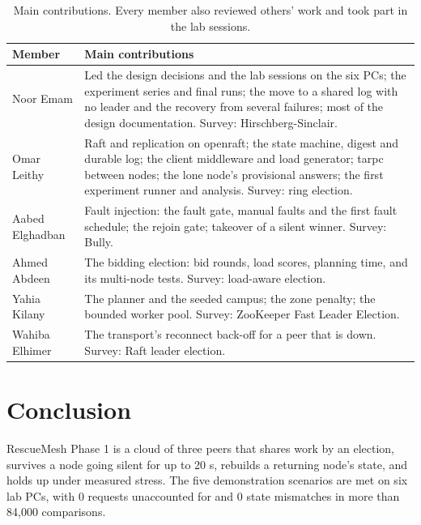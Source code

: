 \begin{table}[!htb]
\centering\small
\caption{Main contributions. Every member also reviewed others' work and took part in the lab sessions.}
\label{tab:team}
\begin{tabularx}{\linewidth}{@{}P{2.9cm}L@{}}
\toprule
Member & Main contributions \\
\midrule
Noor Emam & Led the design decisions and the lab sessions on the six PCs; the experiment series and final runs; the move to a shared log with no leader and the recovery from several failures; most of the design documentation. Survey: Hirschberg-Sinclair. \\
Omar Leithy & Raft and replication on openraft; the state machine, digest and durable log; the client middleware and load generator; tarpc between nodes; the lone node's provisional answers; the first experiment runner and analysis. Survey: ring election. \\
Aabed Elghadban & Fault injection: the fault gate, manual faults and the first fault schedule; the rejoin gate; takeover of a silent winner. Survey: Bully. \\
Ahmed Abdeen & The bidding election: bid rounds, load scores, planning time, and its multi-node tests. Survey: load-aware election. \\
Yahia Kilany & The planner and the seeded campus; the zone penalty; the bounded worker pool. Survey: ZooKeeper Fast Leader Election. \\
Wahiba Elhimer & The transport's reconnect back-off for a peer that is down. Survey: Raft leader election. \\
\bottomrule
\end{tabularx}
\end{table}

\section{Conclusion}

RescueMesh Phase 1 is a cloud of three peers that shares work by an election, survives a node going silent for up to 20 s, rebuilds a returning node's state, and holds up under measured stress. The five demonstration scenarios are met on six lab PCs, with 0 requests unaccounted for and 0 state mismatches in more than 84,000 comparisons.

